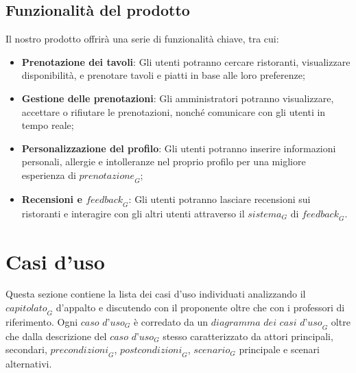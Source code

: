 \documentclass[12pt, oneside]{article}
\begin{document}
\subsection{Funzionalità del prodotto}
Il nostro prodotto offrirà una serie di funzionalità chiave, tra cui:
\begin{itemize}
\item \textbf{Prenotazione dei tavoli}: Gli utenti potranno cercare ristoranti, visualizzare disponibilità, e prenotare tavoli e piatti in base alle loro preferenze;
\item \textbf{Gestione delle prenotazioni}: Gli amministratori potranno visualizzare, accettare o rifiutare le prenotazioni, nonché comunicare con gli utenti in tempo reale;
\item \textbf{Personalizzazione del profilo}: Gli utenti potranno inserire informazioni personali, allergie e intolleranze nel proprio profilo per una migliore esperienza di $\textit{prenotazione}_G$;
\item \textbf{Recensioni e $\textit{feedback}_G$}: Gli utenti potranno lasciare recensioni sui ristoranti e interagire con gli altri utenti attraverso il $\textit{sistema}_G$ di $\textit{feedback}_G$.
\end{itemize}


\newpage

\section{Casi d'uso}
Questa sezione contiene la lista dei casi d'uso individuati analizzando il $\textit{capitolato}_G$ d'appalto e discutendo con il proponente oltre che con i professori di riferimento. Ogni $\textit{caso d'uso}_G$ è corredato da un $\textit{diagramma dei casi d'uso}_G$ oltre che dalla descrizione del $\textit{caso d'uso}_G$ stesso caratterizzato da attori principali, secondari, $\textit{precondizioni}_G$, $\textit{postcondizioni}_G$, $\textit{scenario}_G$ principale e scenari alternativi.
\end{document}
